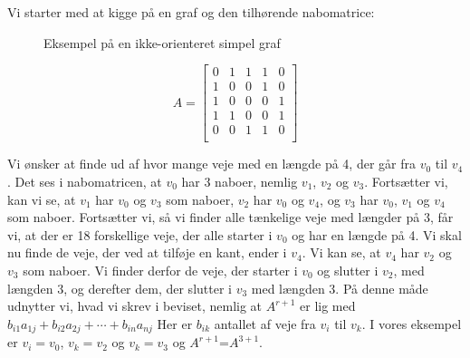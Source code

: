 \begin{exmp}
Vi starter med at kigge på en graf og den tilhørende nabomatrice:
\begin{figure}[H]
\centering
	\caption{Eksempel på en ikke-orienteret simpel graf}
	\label{fig.vaegtetopg}
\end{figure}


\begin{equation}
A=\begin{bmatrix}
    0&1&1&1&0\\
    1&0&0&1&0\\
    1&0&0&0&1\\
    1&1&0&0&1\\
    0&0&1&1&0\\
\end{bmatrix}
\end{equation}


Vi ønsker at finde ud af hvor mange veje med en længde på 4, der går fra $v_0$ til $v_4$. Det ses i nabomatricen, at $v_0$ har 3 naboer, nemlig $v_1$, $v_2$ og $v_3$. Fortsætter vi, kan vi se, at $v_1$ har $v_0$ og $v_3$ som naboer, $v_2$ har $v_0$ og $v_4$, og $v_3$ har $v_0$, $v_1$ og $v_4$ som naboer. Fortsætter vi, så vi finder alle tænkelige veje med længder på 3, får vi, at der er 18 forskellige veje, der alle starter i $v_0$ og har en længde på 4. Vi skal nu finde de veje, der ved at tilføje en kant, ender i $v_4$. Vi kan se, at $v_4$ har $v_2$ og $v_3$ som naboer. Vi finder derfor de veje, der starter i $v_0$ og slutter i $v_2$, med længden 3, og derefter dem, der slutter i $v_3$ med længden 3. På denne måde udnytter vi, hvad vi skrev i beviset, nemlig at
\textbf{$A^{r+1}$} er lig med $b_{i1}a_{1j} + b_{i2}a_{2j} +\cdots+ b_{in}a_{nj}$
Her er $b_{ik}$ antallet af veje fra $v_{i}$ til ${v_k}$. I vores eksempel er $v_{i}=v_{0}$, ${v_k}=v_{2}$ og ${v_k}=v_{3}$ og \textbf{$A^{r+1}$}=\textbf{$A^{3+1}$}. 
 

\end{exmp}
